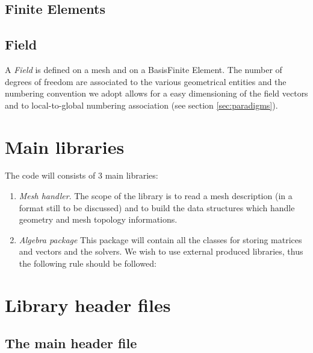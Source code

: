 \subsection{Finite Elements}

\subsection{Field}
A \textit{Field} is defined on a mesh and on a BasisFinite Element.
The number of degrees of freedom are associated to the various
geometrical entities and the numbering convention we adopt allows for
a easy dimensioning of the field vectors and to local-to-global
numbering association (see section \ref{sec:paradigms}).
\section{Main libraries} 
%
The code will consists of 3 main libraries:
\begin{enumerate}
\item \emph{Mesh handler}. The scope of the library is to read a mesh
  description (in a format still to be discussed) and to build the
  data structures which handle geometry and mesh topology
  informations.
\item \emph{Algebra package} This package will contain all the classes
  for storing matrices and vectors and the solvers. We wish to use
  external produced libraries, thus the following rule should be
  followed:
\end{enumerate}
%

%
\section{Library header files}
\subsection{The main header file}

